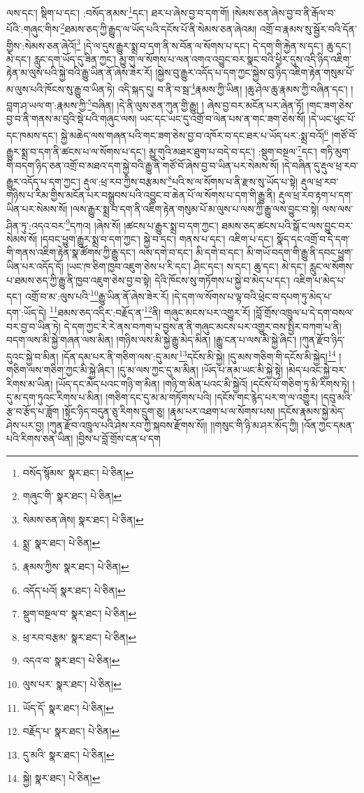 ལས་དང་། སྡིག་པ་དང་། :བསོད་ནམས་\footnote{བསོད་སྙོམས་  སྣར་ཐང་།  པེ་ཅིན། }དང་། ཐར་པ་ཞེས་བྱ་བ་དག་གོ། །སེམས་ཅན་ཞེས་བྱ་བ་ནི་རྒོལ་བ་པོའི་:གཞུང་གིས་\footnote{གཞུང་གི་  སྣར་ཐང་།  པེ་ཅིན། }ཐམས་ཅད་ཀྱི་རྒྱུད་ལ་ཡོད་པའི་དངོས་པོ་ནི་སེམས་ཅན་ཞེའམ། འགྲོ་བ་རྣམས་སུ་སྦྱོར་བའི་དོན་གྱིས་:སེམས་ཅན་ཞེའོ།\footnote{སེམས་ཅན་ཞེས།  སྣར་ཐང་།  པེ་ཅིན། } །དེ་ལ་དུས་རྒྱུར་སྨྲ་བ་དག་ནི་ས་བོན་ལ་སོགས་པ་དང་། དེ་དག་གི་རྐྱེན་ས་དང་། ཆུ་དང་། མེ་དང་། རླུང་དག་ཡོད་དུ་ཟིན་ཀྱང་། མྱུ་གུ་ལ་སོགས་པ་ལན་འགའ་འབྱུང་བར་སྣང་བའི་ཕྱིར་དུས་འདི་ཉིད་འཇིག་རྟེན་མ་ལུས་པའི་སྐྱེ་བའི་རྒྱུ་ཡིན་ནོ་ཞེས་ཟེར་རོ། །སྐྱེས་བུ་རྒྱུར་འདོད་པ་དག་ཀྱང་སྐྱེས་བུ་ཉིད་འཇིག་རྟེན་གསུམ་པོ་མ་ལུས་པའི་ཁོངས་སུ་རྒྱུ་བ་ཡིན་ཏེ། འདི་སྐད་དུ། བ་ནི་བ་སྦ་\footnote{སྨྲ་  སྣར་ཐང་།  པེ་ཅིན། }རྣམས་ཀྱི་ཡིན། །ཆུ་ཤེལ་ཆུ་རྣམས་ཀྱི་བཞིན་དང་། །བླག་ཤ་ཡལ་ག་:རྣམས་ཀྱི་\footnote{རྣམས་ཀྱིས་  སྣར་ཐང་།  པེ་ཅིན། }བཞིན། །དེ་ནི་ལུས་ཅན་ཀུན་གྱི་རྒྱུ། །
ཞེས་བྱ་བར་མངོན་པར་ཞེན་ཏོ། །གང་ཟག་ཅེས་བྱ་བ་ནི་གནས་མ་བུའི་སྡེ་པའི་གཞུང་ལས། ཡང་དང་ཡང་དུ་འགྲོ་བ་ལེན་པས་ན་གང་ཟག་ཅེས་སོ། །དེ་ཡང་ཕུང་པོ་དང་ཁམས་དང་། སྐྱེ་མཆེད་ལས་གཞན་པའི་གང་ཟག་ཅེས་བྱ་བ་འཁོར་བ་དང་ཐར་པ་ཡོད་པར་:སྨྲ་བའོ།\footnote{འདོད་པའོ།  སྣར་ཐང་།  པེ་ཅིན། } །གཙོ་བོ་རྒྱུར་སྨྲ་བ་དག་ནི་ཚངས་པ་ལ་སོགས་པ་དང་། མྱུ་གུའི་མཐར་ཐུག་པ་བདེ་བ་དང་། :སྡུག་བསྔལ་\footnote{སྡུག་བསྔལ་བ་  སྣར་ཐང་།  པེ་ཅིན། }དང་། གཏི་མུག་གི་བདག་ཉིད་ཅན་འགྲོ་བ་མཐའ་དག་སྐྱེ་བའི་རྒྱུ་ནི་གཙོ་བོ་ཞེས་བྱ་བ་ཡིན་པར་སེམས་སོ། །དེ་བཞིན་དུ་རྡུལ་ཕྲ་རབ་རྒྱུར་འདོད་པ་དག་ཀྱང་། རྡུལ་:ཕྲ་རབ་ཀྱིས་བརྩམས་\footnote{ཕྲ་རབ་བརྩམ་  སྣར་ཐང་།  པེ་ཅིན། }པའི་ས་ལ་སོགས་པ་ནི་རྫས་སུ་ཡོད་པ་སྟེ། རྡུལ་ཕྲ་རབ་གཉིས་པ་རིམ་གྱིས་མངོན་པར་བསྒྲུབས་པའི་འབྱུང་བ་ཆེན་པོ་ལ་སོགས་པ་དག་གི་རྒྱུ་ནི། རྡུལ་ཕྲ་རབ་རྟག་པ་དག་ཡིན་པར་སེམས་སོ། །ལས་རྒྱུར་སྨྲ་བ་དག་ནི་འཇིག་རྟེན་གསུམ་པོ་མ་ལུས་པ་ལས་ཀྱི་རྒྱུ་ལས་བྱུང་བ་སྟེ། ལས་ལས་ཤིན་ཏུ་:འདའ་བར་\footnote{འདའ་བ་  སྣར་ཐང་།  པེ་ཅིན། }དཀའ། །ཞེས་སོ། །ཚངས་པ་རྒྱུར་སྨྲ་བ་དག་ཀྱང་། ཐམས་ཅད་ཚངས་པའི་སྒོ་ང་ལས་བྱུང་བར་སེམས་སོ། །དབང་ཕྱུག་རྒྱུར་སྨྲ་བ་དག་ཀྱང་། སྐྱེ་བ་དང་། གནས་པ་དང་། འཇིག་པ་དང་། སྣོད་དང་འགྲོ་བ་དེ་དག་གི་གནས་འཇིག་རྟེན་སྣ་ཚོགས་ཀྱི་རྒྱུ་དང་། ལས་དགེ་བ་དང་། མི་དགེ་བ་དང་། མི་གཡོ་བདག་གི་རྒྱུ་ནི་དབང་ཕྱུག་ཡིན་པར་འདོད་དོ། །ཡང་ཁ་ཅིག་ཁྱབ་འཇུག་ཅེས་པ་རི་དང་། ཤིང་དང་། ས་དང་། ཆུ་དང་། མེ་དང་། རླུང་ལ་སོགས་པ་ཐམས་ཅད་ཀྱི་རྒྱུ་ནི་ཁྱབ་འཇུག་ཅེས་བྱ་བ་སྟེ། དེའི་ཁོངས་སུ་གཏོགས་པ་སྐྱེ་བ་མེད་པ་དང་། འཇིག་པ་མེད་པ་དང་། འགྲོ་བ་མ་:ལུས་པའི་\footnote{ལུས་པར་  སྣར་ཐང་།  པེ་ཅིན། }རྒྱུ་ཡིན་ནོ་ཞེས་ཟེར་རོ། །དེ་དག་ལ་སོགས་པ་ལྟ་བའི་ཕྲེང་བ་དཔག་ཏུ་མེད་པ་དག་:ཡོད་དེ། \footnote{ཡོད་དོ་  སྣར་ཐང་།  པེ་ཅིན། }ཐམས་ཅད་འདིར་:བརྗོད་ན་\footnote{བརྗོད་པ་  སྣར་ཐང་།  པེ་ཅིན། }ནི། གཞུང་མངས་པར་འགྱུར་རོ། །བློ་གྲོས་འཁྲུལ་པ་དེ་དག་བསལ་བར་བྱ་བ་ཡིན་ཏེ། དེ་དག་ཀྱང་རེ་རེ་ནས་བཀག་པ་བྱས་ན་ནི་གཞུང་མངས་པར་འགྱུར་བས་སྤྱིར་བཀག་པ་ནི། བདག་ལས་མི་སྐྱེ་གཞན་ལས་མིན། །གཉིས་ལས་མི་སྐྱེ་རྒྱུ་མེད་མིན། །རྒྱུ་ངན་པ་ལས་མི་སྐྱེ་ཞིང་། །ཀུན་རྫོབ་ཉིད་དུའང་སྐྱེ་བ་མིན། །དོན་དམ་པར་ནི་གཅིག་ལས་:དུ་མས་\footnote{དུ་མའི་  སྣར་ཐང་།  པེ་ཅིན། }དངོས་མི་སྐྱེ། །དུ་མས་གཅིག་གི་དངོས་མི་སྐྱེད།\footnote{སྐྱེ།  སྣར་ཐང་།  པེ་ཅིན། } །གཅིག་ལས་གཅིག་ཀྱང་མི་སྐྱེ་ཞིང་། །དུ་མ་ལས་ཀྱང་དུ་མ་མིན། །ཡོད་པ་ནམ་ཡང་མི་སྐྱེ་སྟེ། །མེད་པའང་སྐྱེ་བར་རིགས་མ་ཡིན། །ཡོད་དང་མེད་པའང་གཉི་ག་མིན། །གཉི་ག་མིན་པའང་མི་སྐྱེའོ། །དངོས་པོ་གཅིག་ཏུ་མི་རིགས་ཏེ། །དུ་མ་དག་ཏུའང་རིགས་པ་མིན། །གཅིག་དང་དུ་མ་མ་གཏོགས་པའི། །དངོས་གང་རྙེད་པར་ག་ལ་འགྱུར། །དབུ་མའི་རྩ་བ་རྩོད་པ་ཟློག །སྟོང་ཉིད་བདུན་ཅུ་རིགས་དྲུག་ཅུ། །རྣམ་པར་འཐག་པ་ལ་སོགས་པས། །དངོས་རྣམས་སྐྱེ་མེད་ཤེས་པར་བྱ། །ཀུན་རྫོབ་འཁྲུལ་པའི་ཤེས་རབ་ཀྱི་སྐབས་རྫོགས་སོ།། །།གསུང་གི་ཉི་མ་ཤར་མོད་ཀྱི། །འོན་ཀྱང་དམན་པའི་རིགས་ཅན་ཡིན། །བྱིས་པ་བློ་གྲོས་ངན་པ་དག 